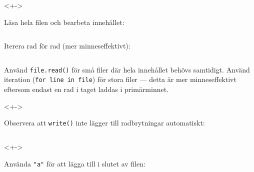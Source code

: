 \begin{frame}[fragile]
  \begin{uncoverenv}<+->
    \begin{example}
      Läsa hela filen och bearbeta innehållet:
      \inputminted[firstline=23,lastline=29,firstnumber=23,highlightlines=27]{python}{examples/read_file.py}
    \end{example}
  \end{uncoverenv}

  \begin{example}
    Iterera rad för rad (mer minneseffektivt):
    \inputminted[firstline=16,lastline=20,firstnumber=16,highlightlines={18-19}]{python}{examples/read_file.py}
  \end{example}
\end{frame}

\begin{frame}
  \begin{remark}
    Använd \texttt{file.read()} för små filer där hela innehållet
    behövs samtidigt. Använd iteration (\texttt{for line in file})
    för stora filer --- detta är mer minneseffektivt eftersom endast en rad i
    taget laddas i primärminnet.
  \end{remark}
\end{frame}


\begin{frame}[fragile]
  \begin{uncoverenv}<+->
    \begin{example}
      Observera att \texttt{write()} inte lägger till radbrytningar automatiskt:
      \inputminted[firstline=31,lastline=36,firstnumber=31,highlightlines={33-34}]{python}{examples/write_file.py}
    \end{example}
  \end{uncoverenv}

  \begin{uncoverenv}<+->
    \begin{example}
      Använda \texttt{"a"} för att lägga till i slutet av filen:
      \inputminted[firstline=5,lastline=9,firstnumber=5,highlightlines=6]{python}{examples/write_file.py}
    \end{example}
  \end{uncoverenv}
\end{frame}

